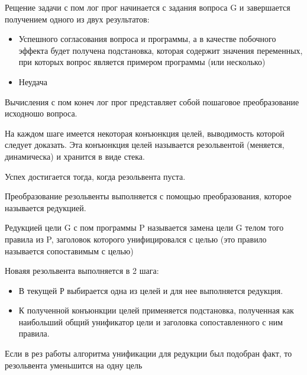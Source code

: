 \documentclass[12pt]{report}
\begin{document}
Рещение задачи с пом лог прог начинается с задания вопроса G и завершается получением одного из двух результатов: 
\begin{itemize}
	\item Успешного согласования вопроса и программы, а в качестве побочного эффекта будет получена подстановка, которая содержит значения переменных, при которых вопрос является примером программы (или несколько)
	\item Неудача
\end{itemize}

Вычисления с пом конеч лог прог представляет собой пошаговое преобразование исходношо вопроса.

На каждом шаге имеется некоторая конъюнкция целей, выводимость которой следует доказать. Эта конъюнкция целей называется резольвентой (меняется, динамическа) и хранится в виде стека.

Успех достигается тогда, когда резольвента пуста.


Преобразование резольвенты выполняется с помощью преобразования, которое называется редукцией.

Редукцией цели G с пом программы P называется замена цели G телом того правила из P, заголовок которого унифицировался с целью (это правило называется сопоставимым с целью)

Новаяя резольвента выполняется в 2 шага:
\begin{itemize}
	\item  В текущей Р выбирается одна из целей и для нее выполняется редукция.
	\item  К полученной конъюнкции целей применяется подстановка, полученная как наибольший общий унификатор цели и заголовка сопоставленного с ним правила.
\end{itemize}

Если в рез работы алгоритма унификации для редукции был подобран факт, то резольвента уменьшится на одну цель
\end{document}
